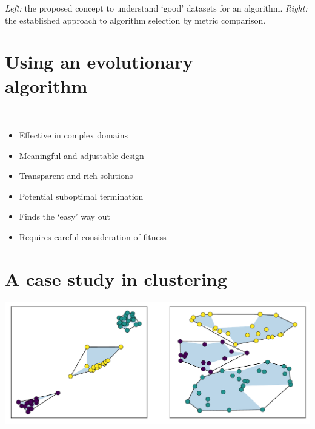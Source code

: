 \documentclass{betterposter}
\begin{document}
{\textcolor{mygrey}{%
    \textit{Left:} the proposed concept to understand `good' datasets for an
    algorithm. \textit{Right:} the established approach to algorithm selection
    by metric comparison.
}

\vspace{-2em}\section{Using an evolutionary\\algorithm}

\vspace{-1em}\begin{minipage}{.04\linewidth}
    \
\end{minipage}
\begin{minipage}{.9\linewidth}
    \begin{itemize}
        \renewcommand\labelitemi{\faThumbsOUp~}
        \item Effective in complex domains
        \item Meaningful and adjustable design
        \item Transparent and rich solutions
    \end{itemize}

    \vspace{1ex}\begin{itemize}
        \renewcommand\labelitemi{\faThumbsODown~}
        \item Potential suboptimal termination
        \item Finds the `easy' way out
        \item Requires careful consideration of fitness
    \end{itemize}
\end{minipage}


\section{A case study in clustering}

\vspace{-1em}\begin{center}
    \begin{minipage}{.8\linewidth}
        \includegraphics[width=\linewidth]{img/kmeans.pdf}\vspace{1ex}


\end{minipage}
\end{center}}
\end{document}
